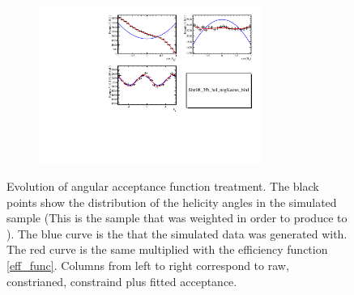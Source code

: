 \begin{figure}[h]
  \vspace*{0.02\textwidth}
  \begin{subfigure}{0.49\textwidth}
    \includegraphics[width=0.8\textwidth]{Figures/Chapter4/acc_constr_fit.pdf}
    \caption{}
    \label{angAcc_fit}
  \end{subfigure}
  \caption{Evolution of angular acceptance function treatment. The black points show the distribution of the helicity angles in the simulated sample 
           (This is the sample that was weighted in order to produce  to ). The blue curve is the \pdf that the
           simulated data was generated with. The red curve is the same \pdf multiplied with the efficiency function \eqref{eff_func}.
           Columns from left to right correspond to raw, constrianed, constraind plus fitted acceptance.
            }
\end{figure}

